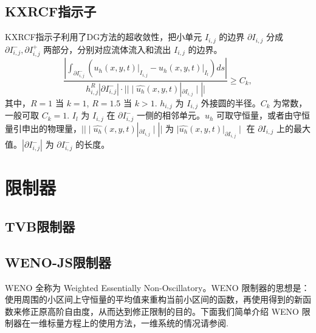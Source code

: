 \documentclass{article}
\numberwithin{equation}{subsection}    %
\begin{document}
\subsection{KXRCF指示子}
KXRCF指示子利用了DG方法的超收敛性\cite{RN92}，把小单元 $I_{i,j}$ 的边界 $\partial I_{i,j}$ 分成 $\partial I_{i,j}^-,\partial I_{i,j}^+$ 两部分，分别对应流体流入和流出 $I_{i,j}$ 的边界。
\begin{equation}
    \frac{\left|\int_{\partial I_{i, j}^{-}}\left(\left.u_{h}(x, y, t)\right|_{I_{i, j}}-\left.u_{h}(x, y, t)\right|_{I_{l}}\right) d s\right|}{h_{i, j}^{R}\left|\partial I_{i, j}^{-}\right| \cdot||\mid \widehat{u_{h}}(x, y, t)|_{\partial I_{i, j}}\mid||} \geq C_{k},
\end{equation}
其中，$R=1$ 当 $k=1$, $R=1.5$ 当 $k>1$. $h_{i,j}$ 为 $I_{i,j}$ 外接圆的半径。$C_k$ 为常数，一般可取 $C_k = 1$. $I_l$ 为 $I_{i,j}$ 在 $\partial I_{i,j}^-$ 一侧的相邻单元。$u_h$ 可取守恒量，或者由守恒量引申出的物理量，$||\mid \widehat{u_{h}}(x, y, t)|_{\partial I_{i, j}}\mid||$ 为 $\mid \widehat{u_{h}}(x, y, t)|_{\partial I_{i, j}}\mid$ 在 $\partial I_{i,j}$ 上的最大值。$|\partial I_{i,j}^-|$ 为 $\partial I_{i,j}^-$ 的长度。
\section{限制器}
\subsection{TVB限制器}

\subsection{WENO-JS限制器}
WENO 全称为 Weighted Essentially Non-Oscillatory。WENO 限制器的思想是：使用周围的小区间上守恒量的平均值来重构当前小区间的函数，再使用得到的新函数来修正原高阶自由度，从而达到修正限制的目的。下面我们简单介绍 WENO 限制器在一维标量方程上的使用方法，一维系统的情况请参阅\cite{WENO-js1}.
\end{document}
